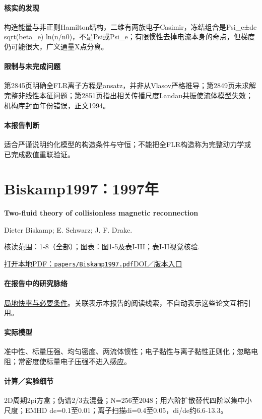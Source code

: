 \paragraph{核实的发现}构造能量与非正则Hamilton结构，二维有两族电子Casimir，冻结组合是Psi\_e±de sqrt(beta\_e) ln(n/n0)，不是Psi或Psi\_e；有限惯性去掉电流本身的奇点，但梯度仍可能很大，广义通量X点分离。

\paragraph{限制与未完成问题}第2845页明确全FLR离子方程是ansatz，并非从Vlasov严格推导；第2849页未求解完整非线性本征问题；第2851页指出相关传播尺度Landau共振使流体模型失效；机构库封面年份错误，正文1994。

\paragraph{本报告判断}适合严谨说明约化模型的构造条件与守恒；不能把全FLR构造称为完整动力学或已完成数值重联验证。

\section{Biskamp1997：1997年}\label{paper:Biskamp1997}

\textbf{Two-fluid theory of collisionless magnetic reconnection}\citep{Biskamp1997}\

Dieter Biskamp;  E. Schwarz;  J. F. Drake.

\textsf{核读范围：}1-8（全部）；\textsf{图表：}图1-5及表I-III；表I-II视觉核验.

\href{run:papers/Biskamp1997.pdf}{打开本地PDF：\texttt{papers/Biskamp1997.pdf}}\quad\href{https://doi.org/10.1063/1.872211}{DOI／版本入口}

\paragraph{在报告中的研究脉络}\hyperref[story:fast]{局地快率与必要条件}。关联表示本报告的阅读线索，不自动表示这些论文互相引用。

\paragraph{实际模型}准中性、标量压强、均匀密度、两流体惯性；电子黏性与离子黏性正则化；忽略电阻；常密度使标量电子压强不进入感应。

\paragraph{计算／实验细节}2D周期2pi方盒；伪谱2/3去混叠；N=256至2048；用六阶扩散替代四阶以集中小尺度；EMHD de=0.1至0.01；离子扫描di=0.4至0.05，di/de约6.6-13.3。

